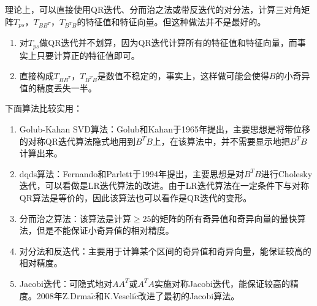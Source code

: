 \documentclass[UTF8]{article}
\begin{document}
\begin{flushleft}
理论上，可以直接使用QR迭代、分而治之法或带反迭代的对分法，计算三对角矩阵$T_{ps}$，$T_{BB^T}$，$T_{B^TB}$的特征值和特征向量。但这种做法并不是最好的。
\begin{enumerate}[(1)]
  \item 对$T_{ps}$做QR迭代并不划算，因为QR迭代计算所有的特征值和特征向量，而事实上只要计算正的特征值即可。
  \item 直接构成$T_{BB^T}$，$T_{B^TB}$是数值不稳定的，事实上，这样做可能会使得$B$的小奇异值的精度丢失一半。
\end{enumerate}

\textcolor[rgb]{0.00,0.07,1.00}{下面算法比较实用：}
\begin{enumerate}[1.]
  \item Golub-Kahan SVD算法：Golub和Kahan于1965年提出，主要思想是将带位移的对称QR迭代算法隐式地用到$B^TB$上，在该算法中，并不需要显示地把$B^TB$计算出来。
  \item dqds算法：Fernando和Parlett于1994年提出，主要思想是对$B^TB$进行Cholesky迭代，可以看做是LR迭代算法的改进。由于LR迭代算法在一定条件下与对称QR算法是等价的，因此该算法也可以看作是QR迭代的变形。
  \item 分而治之算法：该算法是计算$\geq 25$的矩阵的所有奇异值和奇异向量的最快算法，但是不能保证小奇异值的相对精度。
  \item 对分法和反迭代：主要用于计算某个区间的奇异值和奇异向量，能保证较高的相对精度。
  \item Jacobi迭代：可隐式地对$AA^T$或$A^TA$实施对称Jacobi迭代，能保证较高的精度。2008年Z.Drma$\check{c}$和K.Veseli$\acute{c}$改进了最初的Jacobi算法。
\end{enumerate}
\end{flushleft}
\end{document}
